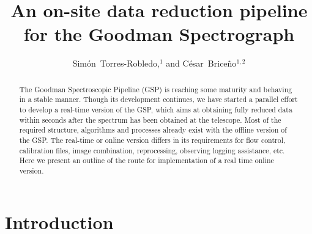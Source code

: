 \documentclass[11pt,twoside]{article}
\begin{document}
\title{An on-site data reduction pipeline for the Goodman Spectrograph}


\author{Sim\'on~Torres-Robledo,$^1$ and C\'esar~Brice\~no$^{1,2}$
  }           %



  
\begin{abstract}

The Goodman Spectroscopic Pipeline (GSP) is reaching some maturity and
behaving in a stable manner. Though its development continues, we have
started a parallel effort to develop a real-time version of the GSP,
which aims at obtaining fully reduced data within seconds after the spectrum
has been obtained at the telescope.  Most of the required structure, algorithms and
processes already exist with the offline version of the GSP. The real-time or online
version differs in its requirements for flow control, calibration files, image combination, reprocessing, observing logging assistance, etc.
Here we present an outline of the route for implementation of a real time online version.
  
\end{abstract}

\section{Introduction}
\end{document}
